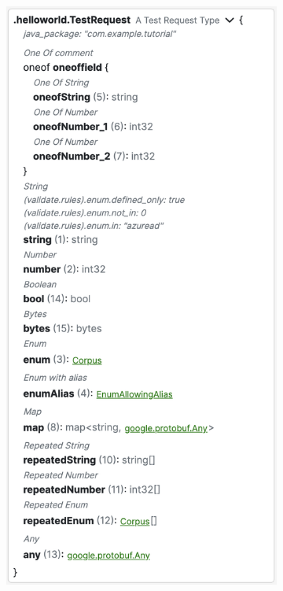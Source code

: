 \begin{figure}[!htb]
    \centering
    \captionsetup{justification=centering}

    \begin{subfigure}{.5\textwidth}
        \centering
        \includegraphics[width=.95\linewidth]{images/implementation/screenshots/message-type}

\end{subfigure}
\end{figure}
